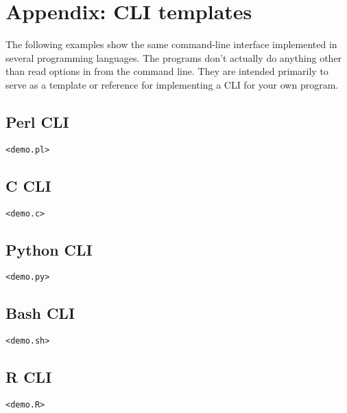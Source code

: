 \documentclass{article}
\begin{document}
\section{Appendix: CLI templates}
The following examples show the same command-line interface implemented in several programming languages. The programs don't actually do anything other than read options in from the command line. They are intended primarily to serve as a template or reference for implementing a CLI for your own program.

\subsection{Perl CLI}

\begin{verbatim}
<demo.pl>
\end{verbatim}

\subsection{C CLI}

\begin{verbatim}
<demo.c>
\end{verbatim}

\subsection{Python CLI}

\begin{verbatim}
<demo.py>
\end{verbatim}

\subsection{Bash CLI}

\begin{verbatim}
<demo.sh>
\end{verbatim}

\subsection{R CLI}

\begin{verbatim}
<demo.R>
\end{verbatim}
\end{document}
